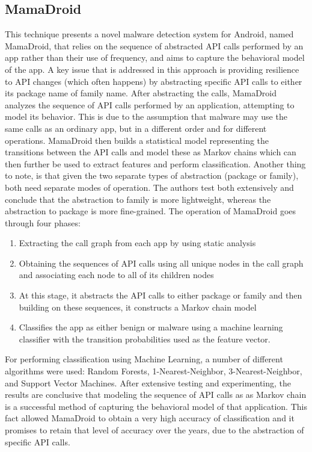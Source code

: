 \documentclass[11pt]{article}
\begin{document}
	\subsection{MamaDroid}
	This technique presents a novel malware detection system for Android, named MamaDroid, that relies on the sequence of abstracted API calls performed by an app rather than their use of frequency, and aims to capture the behavioral model of the app. A key issue that is addressed in this approach is providing resilience to API changes (which often happens) by abstracting specific API calls to either its package name of family name.
	After abstracting the calls, MamaDroid analyzes the sequence of API calls performed by an application, attempting to model its behavior. This is due to the assumption that malware may use the same calls as an ordinary app, but in a different order and for different operations. MamaDroid then  builds a statistical model representing the transitions between the API calls and model these as Markov chains which can then further be used to extract features and perform classification. Another thing to note, is that given the two separate types of abstraction (package or family), both need separate modes of operation. The authors test both extensively and conclude that the abstraction to family is more lightweight, whereas the abstraction to package is more fine-grained.
	The operation of MamaDroid goes through four phases:
	\begin{enumerate}
		\item Extracting the call graph from each app by using static analysis
		\item Obtaining the sequences of API calls using all unique nodes in the call graph and associating each node to all of its children nodes
		\item At this stage, it abstracts the API calls to either package or family and then building on these sequences, it constructs a Markov chain model
		\item Classifies the app as either benign or malware using a machine learning classifier with the transition probabilities used as the feature vector. 
	\end{enumerate}
	For performing classification using Machine Learning, a number of different algorithms were used: Random Forests, 1-Nearest-Neighbor, 3-Nearest-Neighbor, and Support Vector Machines. After extensive testing and experimenting, the results are conclusive that modeling the sequence of API calls as as Markov chain is a successful method of capturing the behavioral model of that application. This fact allowed MamaDroid to obtain a very high accuracy of classification and it promises to retain that level of accuracy over the years, due to the abstraction of specific API calls.
	
\end{document}
